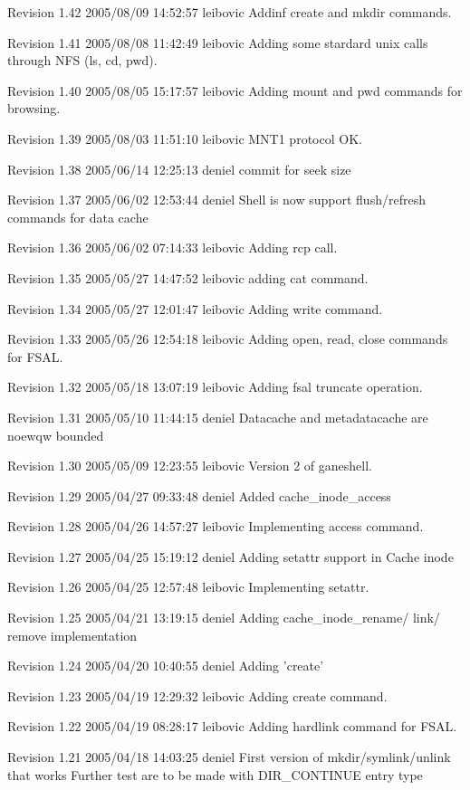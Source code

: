 Revision 1.42 2005/08/09 14:52:57 leibovic Addinf create and mkdir commands.

Revision 1.41 2005/08/08 11:42:49 leibovic Adding some stardard unix calls through NFS (ls, cd, pwd).

Revision 1.40 2005/08/05 15:17:57 leibovic Adding mount and pwd commands for browsing.

Revision 1.39 2005/08/03 11:51:10 leibovic MNT1 protocol OK.

Revision 1.38 2005/06/14 12:25:13 deniel commit for seek size

Revision 1.37 2005/06/02 12:53:44 deniel Shell is now support flush/refresh commands for data cache

Revision 1.36 2005/06/02 07:14:33 leibovic Adding rcp call.

Revision 1.35 2005/05/27 14:47:52 leibovic adding cat command.

Revision 1.34 2005/05/27 12:01:47 leibovic Adding write command.

Revision 1.33 2005/05/26 12:54:18 leibovic Adding open, read, close commands for FSAL.

Revision 1.32 2005/05/18 13:07:19 leibovic Adding fsal truncate operation.

Revision 1.31 2005/05/10 11:44:15 deniel Datacache and metadatacache are noewqw bounded

Revision 1.30 2005/05/09 12:23:55 leibovic Version 2 of ganeshell.

Revision 1.29 2005/04/27 09:33:48 deniel Added cache\_\-inode\_\-access

Revision 1.28 2005/04/26 14:57:27 leibovic Implementing access command.

Revision 1.27 2005/04/25 15:19:12 deniel Adding setattr support in Cache inode

Revision 1.26 2005/04/25 12:57:48 leibovic Implementing setattr.

Revision 1.25 2005/04/21 13:19:15 deniel Adding cache\_\-inode\_\-rename/ link/ remove implementation

Revision 1.24 2005/04/20 10:40:55 deniel Adding 'create'

Revision 1.23 2005/04/19 12:29:32 leibovic Adding create command.

Revision 1.22 2005/04/19 08:28:17 leibovic Adding hardlink command for FSAL.

Revision 1.21 2005/04/18 14:03:25 deniel First version of mkdir/symlink/unlink that works Further test are to be made with DIR\_\-CONTINUE entry type

